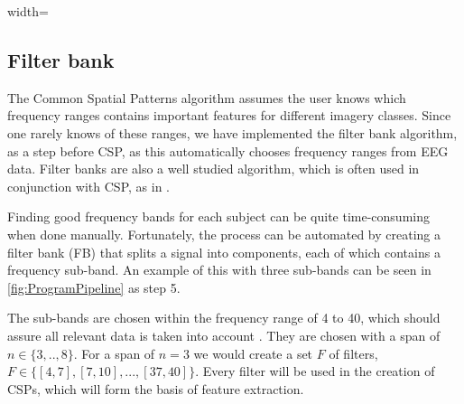 \begin {figure*}
\begin{adjustbox}{width=\textwidth}
\end{adjustbox}
\caption{Overview of program pipeline}
\label{fig:ProgramPipeline}
\end{figure*}
\subsection{Filter bank}\label{sec:filterbank}
The Common Spatial Patterns algorithm assumes the user knows which frequency ranges contains important features for different imagery classes. Since one rarely knows of these ranges, we have implemented the filter bank algorithm, as a step before CSP, as this automatically chooses frequency ranges from EEG data. Filter banks are also a well studied algorithm, which is often used in conjunction with CSP, as in \cite{ang2008filter}. 

Finding good frequency bands for each subject can be quite time-consuming when done manually. Fortunately, the process can be automated by creating a filter bank (FB) that splits a signal into components, each of which contains a frequency sub-band. An example of this with three sub-bands can be seen in \cref{fig:ProgramPipeline} as step 5.

The sub-bands are chosen within the frequency range of 4 to 40, which should assure all relevant data is taken into account \citep{pfurtscheller1999event}. They are chosen with a span of $n \in \{3,..,8\}$. For a span of $n = 3$ we would create a set $F$ of filters, $F \in \{[4, 7], [7, 10],...,[37, 40]\}$. Every filter will be used in the creation of CSPs, which will form the basis of feature extraction.
